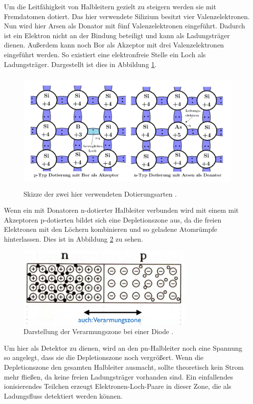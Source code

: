 Um die Leitfähigkeit von Halbleitern gezielt zu steigern werden sie mit Fremdatomen dotiert. Das hier verwendete Silizium besitzt vier Valenzelektronen. Nun wird hier Arsen als Donator mit fünf Valenzelektronen eingeführt. Dadurch ist ein Elektron nicht an der Bindung beteiligt und kann als Ladungsträger dienen. Außerdem kann noch Bor als Akzeptor mit drei Valenzelektronen eingeführt werden. So existiert eine elektronfreie Stelle ein Loch als Ladungsträger. Dargestellt ist dies in Abbildung \ref{fig:dotierung}.

\begin{figure}
  \centering
  \includegraphics[height=6cm]{TimosAufrisse/dotierung.png}
  \caption{Skizze der zwei hier verwendeten Dotierungsarten \cite{anleitung}.}
  \label{fig:dotierung}
\end{figure}

Wenn ein mit Donatoren n-dotierter Halbleiter verbunden wird mit einem mit Akzeptoren p-dotierten bildet sich eine Depletionszone aus, da die freien Elektronen mit den Löchern kombinieren und so geladene Atomrümpfe hinterlassen. Dies ist in Abbildung \ref{fig:pnuebergang} zu sehen.

\begin{figure}
  \centering
  \includegraphics[height=4cm]{TimosAufrisse/pnuebergang.png}
  \caption{Darstellung der Verarmungszone bei einer Diode \cite{goessling}.}
  \label{fig:pnuebergang}
\end{figure}

Um hier als Detektor zu dienen, wird an den pn-Halbleiter noch eine Spannung so angelegt, dass sie die Depletionszone noch vergrößert.
Wenn die Depletionszone den gesamten Halbleiter ausmacht, sollte theoretisch kein Strom mehr fließen, da keine freien Ladungsträger vorhanden sind. Ein einfallendes ionisierendes Teilchen erzeugt Elektronen-Loch-Paare in dieser Zone, die als Ladungsfluss detektiert werden können.

